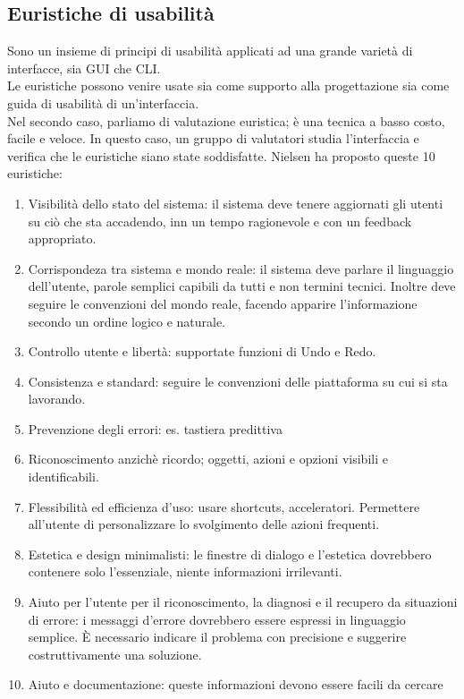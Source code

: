 \documentclass{article}
\begin{document}
\subsection{Euristiche di usabilità}
Sono un insieme di principi di usabilità applicati ad una grande varietà di interfacce, sia GUI che CLI.\\
Le euristiche possono venire usate sia come supporto alla progettazione sia come guida di usabilità di un'interfaccia.\\
Nel secondo caso, parliamo di valutazione euristica; è una tecnica a basso costo, facile e veloce. In questo caso, un gruppo di valutatori studia l'interfaccia e verifica che le euristiche siano state soddisfatte.
Nielsen ha proposto queste 10 euristiche:
\begin{enumerate}
	\item Visibilità dello stato del sistema: il sistema deve tenere aggiornati gli utenti su ciò che sta accadendo, inn un tempo ragionevole e con un feedback appropriato.
	\item Corrispondeza tra sistema e mondo reale: il sistema deve parlare il linguaggio dell'utente, parole semplici capibili da tutti e non termini tecnici. Inoltre deve seguire le convenzioni del mondo reale, facendo apparire l'informazione secondo un ordine logico e naturale.
	\item Controllo utente e libertà: supportate funzioni di Undo e Redo.
	\item Consistenza e standard: seguire le convenzioni delle piattaforma su cui si sta lavorando.
	\item Prevenzione degli errori: es. tastiera predittiva
	\item Riconoscimento anzichè ricordo; oggetti, azioni e opzioni visibili e identificabili.
	\item Flessibilità ed efficienza d'uso: usare shortcuts, acceleratori. Permettere all'utente di personalizzare lo svolgimento delle azioni frequenti.
	\item Estetica e design minimalisti: le finestre di dialogo e l'estetica dovrebbero contenere solo l'essenziale, niente informazioni irrilevanti.
	\item Aiuto per l'utente per il riconoscimento, la diagnosi e il recupero da situazioni di errore: i messaggi d'errore dovrebbero essere espressi in linguaggio semplice. È necessario indicare il problema con precisione e suggerire costruttivamente una soluzione.
	\item Aiuto e documentazione: queste informazioni devono essere facili da cercare
\end{enumerate}
\end{document}
